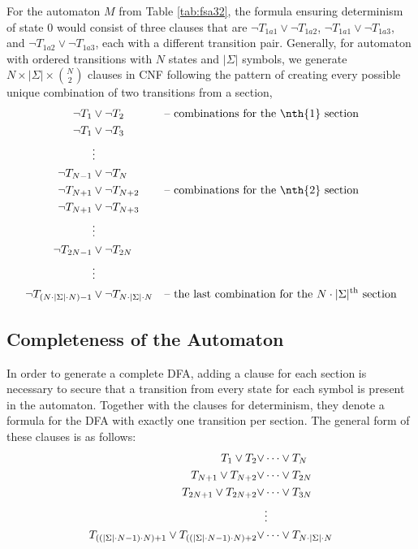 For the automaton $M$ from Table \ref{tab:fsa32}, the formula ensuring determinism of state $0$ would consist of three clauses that are $\neg T_{1a1} \lor \neg T_{1a2}$, $\neg T_{1a1} \lor \neg T_{1a3}$, and $\neg T_{1a2} \lor \neg T_{1a3}$, each with a different transition pair. Generally, for automaton with ordered transitions with $N$ states and $|\Sigma|$ symbols, we generate $N\times|\Sigma|\times\binom{N}{2}$ clauses in CNF following the pattern of creating every possible unique combination of two transitions from a section,
\begin{align*}
    \centering
    \neg T_1 &\lor \neg T_2  && \text{-- combinations for the \nth{1} section}\\
    \neg T_1 &\lor \neg T_3 \\
    & \vdots \notag \\
    \neg T_{N-1} &\lor \neg T_{N} \\
    \neg T_{N+1} &\lor \neg T_{N+2} && \text{-- combinations for the \nth{2} section}\\
    \neg T_{N+1} &\lor \neg T_{N+3} \\
    &\vdots \notag \\
    \neg T_{2N-1} & \lor \neg T_{2N} \\
    & \vdots \notag \\
    \neg T_{(N\cdot |\Sigma|\cdot N)-1} & \lor \neg T_{N\cdot |\Sigma|\cdot N} && \text{-- the last combination for the $N\cdot |\Sigma|$\textsuperscript{th} section}
\end{align*}

\subsection{Completeness of the Automaton}
In order to generate a complete DFA, adding a clause for each section is necessary to secure that a transition from every state for each symbol is present in the automaton. Together with the clauses for determinism, they denote a formula for the DFA with exactly one transition per section. The general form of these clauses is as follows:
\begin{align*}
    \centering
    T_1 \lor T_2 \lor & \dots \lor T_{N} \\
    T_{N+1} \lor T_{N+2} \lor & \dots \lor T_{2N} \\
    T_{2N+1} \lor T_{2N+2} \lor & \dots \lor T_{3N} \\
    & \vdots \notag \\
    T_{((|\Sigma|\cdot N-1)\cdot N) + 1} \lor T_{((|\Sigma|\cdot N-1)\cdot N) + 2} \lor & \dots \lor T_{N\cdot|\Sigma|\cdot N}
\end{align*}

